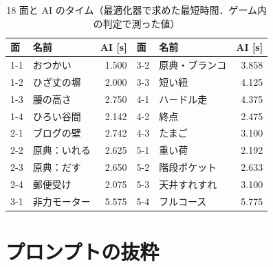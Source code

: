 \documentclass[a4paper,10pt]{ltjsarticle}
\begin{document}
\begin{table}[H]
\centering
\caption{18 面と AI のタイム（最適化器で求めた最短時間．ゲーム内の判定で測った値）}
\small
\begin{tabular}{llr@{\hspace{2em}}llr}
\toprule
面 & 名前 & AI [s] & 面 & 名前 & AI [s] \\
\midrule
1-1 & おつかい & 1.500 & 3-2 & 原典・ブランコ & 3.858 \\
1-2 & ひざ丈の塀 & 2.000 & 3-3 & 短い紐 & 4.125 \\
1-3 & 腰の高さ & 2.750 & 4-1 & ハードル走 & 4.375 \\
1-4 & ひろい谷間 & 2.142 & 4-2 & 終点 & 2.475 \\
2-1 & ブログの壁 & 2.742 & 4-3 & たまご & 3.100 \\
2-2 & 原典：いれる & 2.625 & 5-1 & 重い荷 & 2.192 \\
2-3 & 原典：だす & 2.650 & 5-2 & 階段ポケット & 2.633 \\
2-4 & 郵便受け & 2.075 & 5-3 & 天井すれすれ & 3.100 \\
3-1 & 非力モーター & 5.575 & 5-4 & フルコース & 5.775 \\
\bottomrule
\end{tabular}
\end{table}

\section{プロンプトの抜粋}
\end{document}
